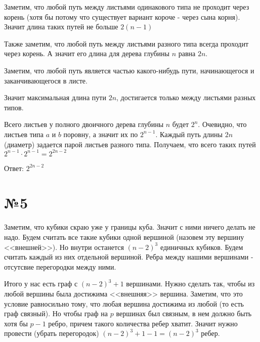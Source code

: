 \documentclass[12pt, tikz]{article}
\begin{document}
	Заметим, что любой путь между листьями одинакового типа не проходит через корень
	(хотя бы потому что существует вариант короче - через сына корня). 
	Значит длина таких путей не больше $2(n-1)$
	
	Также заметим, что любой путь между листьями разного типа всегда проходит через корень.
	А значит его длина для дерева глубины $n$ равна $2n$.
	
	Заметим, что любой путь является частью какого-нибудь пути, начинающегося и заканчивающегося в листе.
	
	Значит максимальная длина пути $2n$, достигается только между листьями разных типов.
	
	Всего листьев у полного двоичного дерева глубины $n$ будет $2^n$. Очевидно, что листьев типа $a$ и $b$
	поровну, а значит их по $2^{n-1}$. Каждый путь длины $2n$ (диаметр) задается парой листьев разного типа.
	Получаем, что всего таких путей $2^{n-1} \cdot 2^{n-1} = 2^{2n-2}$
	
	Ответ: $2^{2n-2}$
	
	\section*{№5}
	

	Заметим, что кубики скраю уже у границы куба. Значит с ними ничего делать не надо. 
	Будем считать все такие кубики одной вершиной (назовем эту вершину <<внешней>>).
	Но внутри останется $(n - 2)^3$ единичных кубиков. Будем считать каждый из них отдельной вершиной.
	Ребра между нашими вершинами - отсутсвие перегородки между ними. 
	
	Итого у нас есть граф с $(n - 2)^3 + 1$ вершинами. Нужно сделать так, чтобы из любой вершины
	была достижима <<внешняя>> вершина. 
	Заметим, что это условие равносильно тому, что любая вершина достижима из любой (то есть граф связный).
	Но чтобы граф на $p$ вершинах был связным, в нем должно быть хотя бы $p - 1$ ребро, причем
	такого количества ребер хватит.
	Значит нужно провести (убрать перегородок) $(n - 2)^3 + 1 - 1= (n - 2)^3$ ребер.
	
\end{document}
